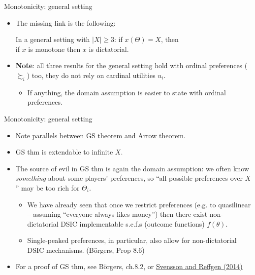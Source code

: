 \documentclass[english,10pt
,aspectratio=169
]{beamer}
\begin{document}
\begin{frame}{Monotonicity: general setting}
	\begin{itemize}
		\item The missing link is the following:
		\begin{theorem}
			In a general setting with $|X|\geq 3$: if $x(\Theta)=X$, then\\
			\centering
			if $x$ is monotone then $x$ is dictatorial.
		\end{theorem}
		\item \textbf{Note}: all three results for the general setting hold with ordinal preferences ($\succsim_i$) too, they do not rely on cardinal utilities $u_i$.
		\begin{itemize}
			\item If anything, the domain assumption is easier to state with ordinal preferences.
		\end{itemize}
	\end{itemize}
\end{frame}


\begin{frame}{Monotonicity: general setting}
	\begin{itemize}
		\item Note parallels between GS theorem and Arrow theorem.
		\item GS thm is extendable to infinite $X$.
		\item The source of evil in GS thm is again the domain assumption: we often know \emph{something} about some players' preferences, so ``all possible preferences over $X$'' may be too rich for $\Theta_i$.
		\begin{itemize}
			\item We have already seen that once we restrict preferences (e.g. to quasilinear -- assuming ``everyone always likes money'') then there exist non-dictatorial DSIC implementable s.c.f.s (outcome functions) $f(\theta)$.
			\item Single-peaked preferences, in particular, also allow for non-dictatorial DSIC mechanisms. (B{\"o}rgers, Prop 8.6)
		\end{itemize}
		\item For a proof of GS thm, see B{\"o}rgers, ch.8.2, or \href{http://dx.doi.org/10.1016/j.jmateco.2014.09.007}{\uline{Svensson and Reffgen (2014)}}
	\end{itemize}
\end{frame}
\end{document}
